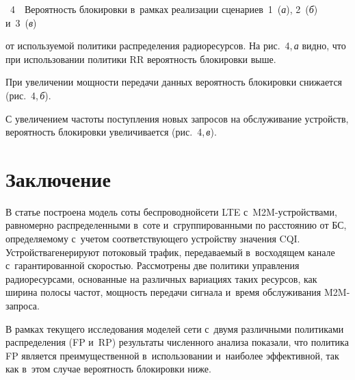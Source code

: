 \begin{multicols}{2}
{\noindent
{{\figurename~4}\ \ \small{Вероятность блокировки в~рамках реализации сценариев~1~(\textit{а}),
2~(\textit{б}) и~3~(\textit{в})}}
}

\vspace*{9.5pt}

\addtocounter{figure}{1}


\noindent
 от используемой политики 
распределения радиоресурсов. На рис.~4,\,\textit{а} видно, что при использовании 
политики RR вероятность блокировки выше. 
  
  При увеличении мощности передачи данных вероятность блокировки 
снижается (рис.~4,\,\textit{б}). 
  


  
  С увеличением частоты поступления новых запросов на обслуживание 
устройств, вероятность блокировки увеличивается (рис.~4,\,\textit{в}). 


\section{Заключение}

  В статье построена модель соты беспроводной\linebreak сети LTE  
с~M2M-устрой\-ст\-ва\-ми, равномерно распределенными в~соте 
и~сгруппированными по расстоянию от БС, определяемому с~учетом 
соответ\-ствующего устройству значения CQI. Устройства\linebreak генерируют 
потоковый трафик, передаваемый в~восходящем канале с~гарантированной 
скоростью. Рассмотрены две политики управления радиоресурсами, 
основанные на различных вариациях таких ресурсов, как ширина полосы 
частот, мощность передачи сигнала и~время обслуживания M2M-за\-проса.
  
  В рамках текущего исследования моделей сети с~двумя различными 
политиками распределения (FP и~RP) результаты 
численного анализа показали, что политика FP является преимущественной 
в~использовании и~наиболее эффективной, так как в~этом случае ве\-ро\-ят\-ность 
блокировки ниже.



\end{multicols}
